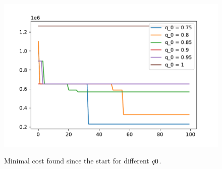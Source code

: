 \begin{figure}[h]
	\begin{centering}
		{\includegraphics[scale=0.8]{figures/experiments/q_0.pdf}}
		\caption{Minimal cost found since the start for different $\protect q0$.}
		\label{fig:q_0}
	\end{centering}
\end{figure}
